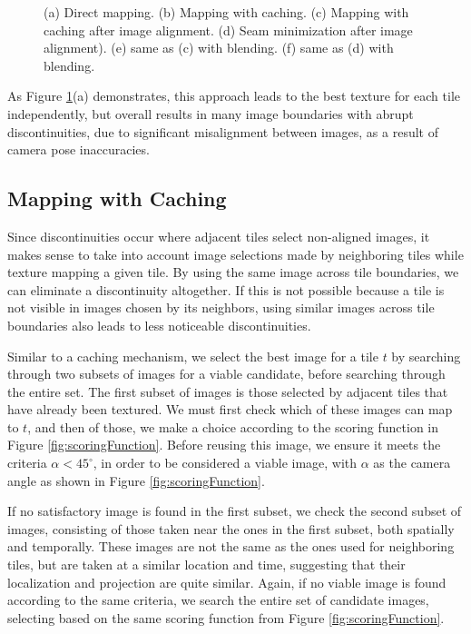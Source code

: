\documentclass[10pt,twocolumn,letterpaper]{article}
\begin{document}
\begin{figure}[h!]
  \centering {}
  \caption{(a) Direct mapping. (b) Mapping with caching. (c) Mapping
    with caching after image alignment. (d) Seam minimization after
    image alignment). (e) same as (c) with blending. (f) same as (d)
    with blending.}
  \label{fig:compareAll}
\end{figure}


As Figure \ref{fig:compareAll}(a) demonstrates, this approach leads to
the best texture for each tile independently, but overall results in
many image boundaries with abrupt discontinuities, due to significant
misalignment between images, as a result of camera pose inaccuracies.

\subsection{Mapping with Caching}
\label{sec:mappingWithCaching}
Since discontinuities occur where adjacent tiles select non-aligned
images, it makes sense to take into account image selections made by
neighboring tiles while texture mapping a given tile. By using the
same image across tile boundaries, we can eliminate a discontinuity
altogether. If this is not possible because a tile is not visible in
images chosen by its neighbors, using similar images across tile
boundaries also leads to less noticeable discontinuities.

Similar to a caching mechanism, we select the best image for a tile
$t$ by searching through two subsets of images for a viable candidate,
before searching through the entire set. The first subset of images is
those selected by adjacent tiles that have already been textured. We
must first check which of these images can map to $t$, and then of
those, we make a choice according to the scoring function in Figure
\ref{fig:scoringFunction}. Before reusing this image, we ensure it
meets the criteria $\alpha < 45^\circ$, in order to be considered a
viable image, with $\alpha$ as the camera angle as shown in Figure
\ref{fig:scoringFunction}.

If no satisfactory image is found in the first subset, we check the
second subset of images, consisting of those taken near the ones in
the first subset, both spatially and temporally. These images are not
the same as the ones used for neighboring tiles, but are taken at a
similar location and time, suggesting that their localization and
projection are quite similar. Again, if no viable image is found
according to the same criteria, we search the entire set of candidate
images, selecting based on the same scoring function from Figure
\ref{fig:scoringFunction}.
\end{document}
